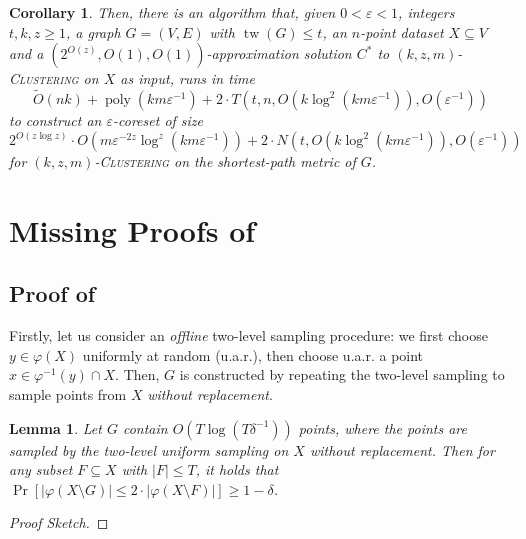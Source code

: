 \documentclass[letterpaper,11pt]{article}
\theoremstyle{plain}
\newtheorem{lemma}[theorem]{Lemma}
\newtheorem{corollary}[theorem]{Corollary}
\theoremstyle{definition}
\theoremstyle{remark}
\DeclareMathOperator{\poly}{poly}
\DeclareMathOperator{\tw}{tw}
\newcommand{\eps}{\varepsilon}
\renewcommand{\phi}{\varphi}
\newcommand{\ProblemName}[1]{\textsc{#1}}
\newcommand{\kzmC}{\ProblemName{$(k,z,m)$-Clustering}\xspace}
\begin{document}
\begin{appendices}
\begin{corollary}
    Then, there is an algorithm that, given $0<\eps<1$, integers $t,k,z\ge 1$, a graph $G=(V,E)$ with $\tw(G)\le t$, an $n$-point dataset $X\subseteq V$ and a $(2^{O(z)},O(1),O(1))$-approximation solution $C^*$ to \kzmC on $X$ as input, runs in time \begin{equation*}
        \tilde O(nk) + \poly(km\eps^{-1}) + 2\cdot T(t,n,O(k\log^2(km\eps^{-1})),O(\eps^{-1}))
    \end{equation*}
    to construct an $\eps$-coreset of size \begin{equation*}
        2^{O(z\log z)}\cdot O\left(m\eps^{-2z}\log^z(km\eps^{-1})\right) + 2\cdot N\left(t, O(k\log^2(km\eps^{-1})), O(\eps^{-1})\right)
    \end{equation*}
    for \kzmC on the shortest-path metric of $G$.
\end{corollary}      
\section{Missing Proofs of~}
\subsection{Proof of~}
\label{apd:isolated}

\ExtractIsolatedPoint*


Firstly, let us consider an \emph{offline} two-level sampling procedure:
we first choose $y\in \phi(X)$ uniformly at random (u.a.r.), then choose u.a.r. a point $x\in \phi^{-1}(y)\cap X$. Then, $G$ is constructed by repeating the two-level sampling to sample points from $X$ \emph{without replacement}.
\begin{lemma}
    \label{lem:offline isolated}
    Let $G$ contain $O(T\log(T\delta^{-1}))$ points, where the points are sampled by the two-level uniform sampling on $X$ without replacement. Then for any subset $F\subseteq X$ with $|F|\le T$, it holds that $\Pr\left[|\phi(X\setminus G)|\le 2\cdot |\phi(X\setminus F)|\right]\ge 1-\delta$.
\end{lemma}
\begin{proof}[Proof Sketch]
    

\end{proof}
\end{appendices}
\end{document}
